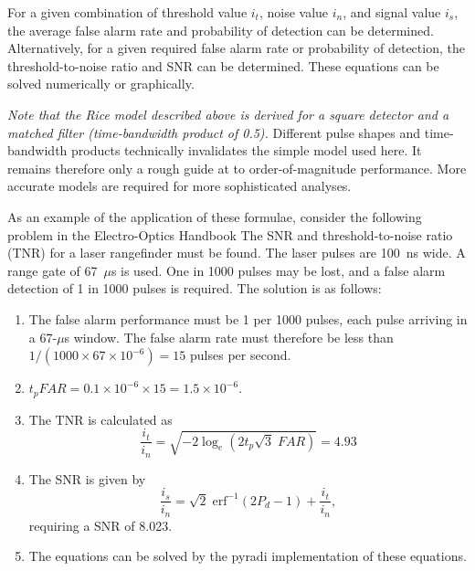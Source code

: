 For a given combination of threshold value $i_t$, noise value $i_n$, and signal value $i_s$, the average false alarm rate and probability of detection can be determined. Alternatively, for a given required false alarm rate or probability of detection, the threshold-to-noise ratio and SNR can be determined. These equations can be solved numerically or graphically.

\textit{Note that the Rice model described above is derived for a square detector and a matched filter (time-bandwidth product of 0.5).}  Different pulse shapes and time-bandwidth products technically invalidates the simple model used here.  It remains therefore only a rough guide at to order-of-magnitude performance.  More accurate models are required for more sophisticated analyses.

As an example of the application of these formulae, consider the following
problem in the Electro-Optics Handbook The SNR and threshold-to-noise ratio  (TNR) for a laser rangefinder must be found. The laser pulses are 100~ns wide. A range gate of 67~$\mu$s is used. One in 1000 pulses may be lost, and a false alarm detection of 1 in 1000 pulses is required.  The solution is as follows:

\begin{enumerate}
\item 
The false alarm performance must be 1 per 1000 pulses, each pulse arriving in a 67-$\mu$s window. The false alarm rate must therefore be less than $1/(1000 \times 67 \times 10^{-6})=15$ pulses per second.

\item   $t_p {FAR} =0.1\times 10^{-6}\times 15=1.5\times
10^{-6}$.

\item   The TNR is calculated as
\begin{equation}
\frac{i_t}{i_n}=\sqrt{-2\log_e\left(2 t_p \sqrt{3}\;{FAR}\right)}=4.93
\end{equation}

\item  The SNR is given by
\begin{equation}
\frac{i_s}{i_n}=\sqrt{2}\;{\textrm{erf}}^{-1}\left(2P_d-1\right)+\frac{i_t}{i_n},
\end{equation}
requiring a SNR of 8.023.

\item  The equations can be solved by the pyradi implementation of these equations. 
\end{enumerate}


